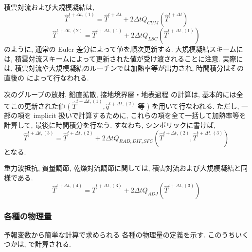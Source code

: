 積雲対流および大規模凝結は,
\begin{equation}
  \hat{T}^{t+\Delta t,(1)} = \hat{T}^{t+\Delta t} 
                         +  2 \Delta t Q_{CUM}(\hat{T}^{t+\Delta t})
\end{equation}
\begin{equation}
  \hat{T}^{t+\Delta t,(2)} = \hat{T}^{t+\Delta t,(1)} 
                         +  2 \Delta t Q_{LSC}(\hat{T}^{t+\Delta t,(1)})
\end{equation}
のように, 通常の Euler 差分によって値を順次更新する.
大規模凝結スキームには, 
積雲対流スキームによって更新された値が受け渡されることに注意.
実際には, 積雲対流や大規模凝結のルーチンでは加熱率等が出力され,
時間積分はその直後の  によって行なわれる.

次のグループの放射, 鉛直拡散, 接地境界層・地表過程
の計算は, 基本的には全てこの更新された値
( $\hat{T}^{t+\Delta t,(1)}, \hat{q}^{t+\Delta t,(2)}$ 等 )
を用いて行なわれる.
ただし, 一部の項を implicit 扱いで計算するために,
これらの項を全て一括して加熱率等を計算して, 
最後に時間積分を行なう.
すなわち, シンボリックに書けば,
\begin{equation}
  \hat{T}^{t+\Delta t,(3)} = \hat{T}^{t+\Delta t,(2)} 
              + 2 \Delta t Q_{RAD,DIF,SFC}
               (\hat{T}^{t+\Delta t,(2)},\hat{T}^{t+\Delta t,(3)})
\end{equation}
となる.

重力波抵抗, 質量調節, 乾燥対流調節に関しては,
積雲対流および大規模凝結と同様である.
\begin{equation}
  \hat{T}^{t+\Delta t,(4)} = \hat{T}^{t+\Delta t,(3)} 
              +  2 \Delta t Q_{ADJ}(\hat{T}^{t+\Delta t,(3)})
\end{equation}



\subsubsection{各種の物理量}

予報変数から簡単な計算で求められる
各種の物理量の定義を示す.
このうちいくつかは, 
 で計算される.

